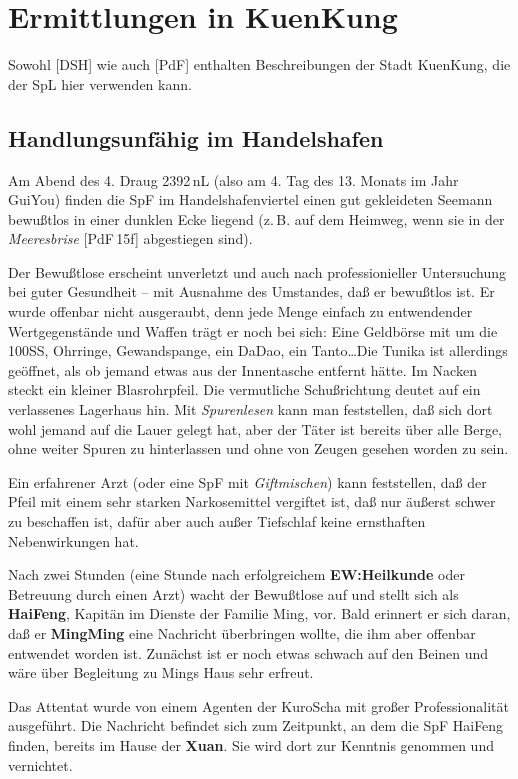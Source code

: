 \documentclass[
a4paper,
twoside,
DIV=calc,
BCOR=4mm,
fontsize=9pt,
twocolumn=on,
titlepage=on,
parskip=half
]{scrartcl}
\begin{document}
\section{Ermittlungen in KuenKung}

Sowohl [DSH] wie auch [PdF] enthalten Beschreibungen der Stadt
KuenKung, die der SpL hier verwenden kann.

\subsection{Handlungsunfähig im Handelshafen}

Am Abend des 4. Draug 2392\,nL (also am 4. Tag des 13. Monats im Jahr
GuiYou) finden die SpF im Handelshafenviertel einen gut gekleideten
Seemann bewußtlos in einer dunklen Ecke liegend (z.\,B. auf dem
Heimweg, wenn sie in der \emph{Meeresbrise} [PdF\,15f] abgestiegen
sind).

Der Bewußtlose erscheint unverletzt und auch nach professionieller
Untersuchung bei guter Gesundheit -- mit Ausnahme des Umstandes, daß
er bewußtlos ist. Er wurde offenbar nicht ausgeraubt, denn jede Menge
einfach zu entwendender Wertgegenstände und Waffen trägt er noch bei
sich: Eine Geldbörse mit um die 100SS, Ohrringe, Gewandspange, ein
DaDao, ein Tanto\dots Die Tunika ist allerdings geöffnet, als ob
jemand etwas aus der Innentasche entfernt hätte. Im Nacken steckt ein
kleiner Blasrohrpfeil.  Die vermutliche Schußrichtung deutet auf ein
verlassenes Lagerhaus hin. Mit \emph{Spurenlesen} kann man
feststellen, daß sich dort wohl jemand auf die Lauer gelegt hat, aber
der Täter ist bereits über alle Berge, ohne weiter Spuren zu
hinterlassen und ohne von Zeugen gesehen worden zu sein.

Ein erfahrener Arzt (oder eine SpF mit \emph{Giftmischen}) kann
feststellen, daß der Pfeil mit einem sehr starken Narkosemittel
vergiftet ist, daß nur äußerst schwer zu beschaffen ist, dafür aber
auch außer Tiefschlaf keine ernsthaften Nebenwirkungen hat.

Nach zwei Stunden (eine Stunde nach erfolgreichem
\textbf{EW:Heilkunde} oder Betreuung durch einen Arzt) wacht der
Bewußtlose auf und stellt sich als \textbf{HaiFeng}, Kapitän im
Dienste der Familie Ming, vor. Bald erinnert er sich daran, daß er
\textbf{MingMing} eine Nachricht überbringen wollte, die ihm aber
offenbar entwendet worden ist. Zunächst ist er noch etwas schwach auf
den Beinen und wäre über Begleitung zu Mings Haus sehr erfreut.

Das Attentat wurde von einem Agenten der KuroScha mit großer
Professionalität ausgeführt. Die Nachricht befindet sich zum
Zeitpunkt, an dem die SpF HaiFeng finden, bereits im Hause der
\textbf{Xuan}. Sie wird dort zur Kenntnis genommen und vernichtet.
\end{document}
